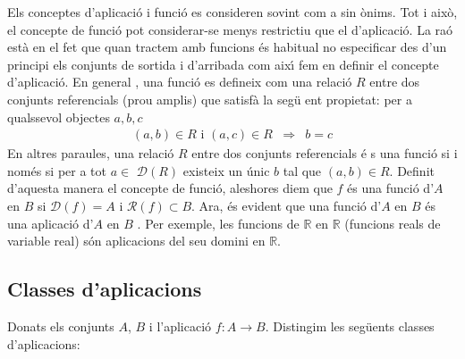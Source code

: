 \begin{observacio}
Els conceptes d'aplicaci\'{o} i funci\'{o} es consideren sovint com a sin%
\`{o}nims. Tot i aix\`{o}, el concepte de funci\'{o} pot considerar-se menys
restrictiu que el d'aplicaci\'{o}. La ra\'{o} est\`{a} en el fet que quan
tractem amb funcions \'{e}s habitual no especificar des d'un principi els
conjunts de sortida i d'arribada com aix\'{\i} fem en definir el concepte
d'aplicaci\'{o}. En general , una funci\'{o} es defineix com una relaci\'{o}
$R$ entre dos conjunts referencials (prou amplis) que satisf\`{a} la seg\"{u}%
ent propietat: per a qualssevol objectes $a,b,c$%
\begin{equation*}
\begin{array}{ccc}
(a,b)\in R\text{ i }(a,c)\in R & \Longrightarrow & b=c%
\end{array}
\end{equation*}
En altres paraules, una relaci\'{o} $R$ entre dos conjunts referencials \'{e}%
s una funci\'{o} si i nom\'{e}s si per a tot $a\in$ $\mathcal{D}(R)$
existeix un \'{u}nic $b$ tal que $(a,b)\in R$. Definit d'aquesta manera el
concepte de funci\'{o}, aleshores diem que $f$ \'{e}s una funci\'{o} d'$A$
en $B$ si $\mathcal{D}(f)=A$ i $\mathcal{R}(f)\subset B$. Ara, \'{e}s
evident que una funci\'{o} d'$A$ en $B$ \'{e}s una aplicaci\'{o} d'$A$ en $B$%
. Per exemple, les funcions de $\mathbb{R}$ en $\mathbb{R}$ (funcions reals
de variable real) s\'{o}n aplicacions del seu domini en $\mathbb{R}$.
\end{observacio}

\subsection{Classes d'aplicacions}

Donats els conjunts $A$, $B$ i l'aplicaci\'{o} $f:A\longrightarrow B$.
Distingim les seg\"{u}ents classes d'aplicacions:

